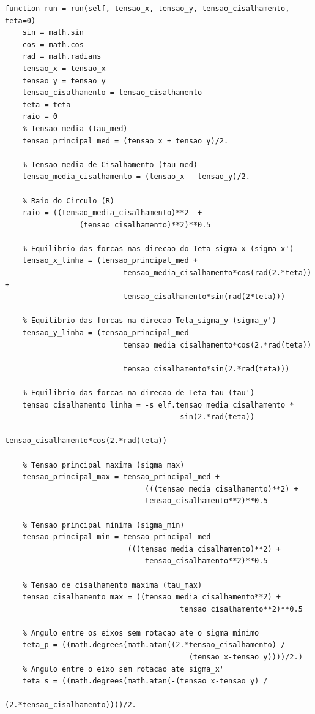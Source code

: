 \documentclass[a4paper]{article}
\begin{document}
\begin{lstlisting}
function run = run(self, tensao_x, tensao_y, tensao_cisalhamento, teta=0)
    sin = math.sin
    cos = math.cos
    rad = math.radians
    tensao_x = tensao_x
    tensao_y = tensao_y
    tensao_cisalhamento = tensao_cisalhamento
    teta = teta
    raio = 0
    % Tensao media (tau_med)
    tensao_principal_med = (tensao_x + tensao_y)/2.

    % Tensao media de Cisalhamento (tau_med)
    tensao_media_cisalhamento = (tensao_x - tensao_y)/2.

    % Raio do Circulo (R)
    raio = ((tensao_media_cisalhamento)**2  + 
                 (tensao_cisalhamento)**2)**0.5

    % Equilibrio das forcas nas direcao do Teta_sigma_x (sigma_x')
    tensao_x_linha = (tensao_principal_med + 
                           tensao_media_cisalhamento*cos(rad(2.*teta)) +
                           tensao_cisalhamento*sin(rad(2*teta)))

    % Equilibrio das forcas na direcao Teta_sigma_y (sigma_y')
    tensao_y_linha = (tensao_principal_med - 
                           tensao_media_cisalhamento*cos(2.*rad(teta)) -
                           tensao_cisalhamento*sin(2.*rad(teta)))

    % Equilibrio das forcas na direcao de Teta_tau (tau')
    tensao_cisalhamento_linha = -s elf.tensao_media_cisalhamento * 
                                        sin(2.*rad(teta))                     
                                        tensao_cisalhamento*cos(2.*rad(teta))

    % Tensao principal maxima (sigma_max)
    tensao_principal_max = tensao_principal_med + 
                                (((tensao_media_cisalhamento)**2) + 
                                tensao_cisalhamento**2)**0.5

    % Tensao principal minima (sigma_min)
    tensao_principal_min = tensao_principal_med - 
                            (((tensao_media_cisalhamento)**2) + 
                                tensao_cisalhamento**2)**0.5

    % Tensao de cisalhamento maxima (tau_max)
    tensao_cisalhamento_max = ((tensao_media_cisalhamento**2) + 
                                        tensao_cisalhamento**2)**0.5

    % Angulo entre os eixos sem rotacao ate o sigma minimo
    teta_p = ((math.degrees(math.atan((2.*tensao_cisalhamento) /
                                          (tensao_x-tensao_y))))/2.)
    % Angulo entre o eixo sem rotacao ate sigma_x'
    teta_s = ((math.degrees(math.atan(-(tensao_x-tensao_y) /
                                          (2.*tensao_cisalhamento))))/2.
\end{lstlisting}
\end{document}
